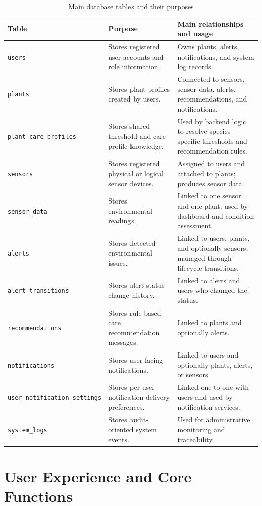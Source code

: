 \begin{table}[H]
\centering
\caption{Main database tables and their purposes}
\label{tab:main-database-tables}
\begin{tabular}{p{}p{}p{}}
\hline
\textbf{Table} & \textbf{Purpose} & \textbf{Main relationships and usage} \\
\hline
\texttt{users} & Stores registered user accounts and role information. & Owns plants, alerts, notifications, and system log records. \\
\texttt{plants} & Stores plant profiles created by users. & Connected to sensors, sensor data, alerts, recommendations, and notifications. \\
\texttt{plant\_care\_profiles} & Stores shared threshold and care-profile knowledge. & Used by backend logic to resolve species-specific thresholds and recommendation rules. \\
\texttt{sensors} & Stores registered physical or logical sensor devices. & Assigned to users and attached to plants; produces sensor data. \\
\texttt{sensor\_data} & Stores environmental readings. & Linked to one sensor and one plant; used by dashboard and condition assessment. \\
\texttt{alerts} & Stores detected environmental issues. & Linked to users, plants, and optionally sensors; managed through lifecycle transitions. \\
\texttt{alert\_transitions} & Stores alert status change history. & Linked to alerts and users who changed the status. \\
\texttt{recommendations} & Stores rule-based care recommendation messages. & Linked to plants and optionally alerts. \\
\texttt{notifications} & Stores user-facing notifications. & Linked to users and optionally plants, alerts, or sensors. \\
\texttt{user\_notification\_settings} & Stores per-user notification delivery preferences. & Linked one-to-one with users and used by notification services. \\
\texttt{system\_logs} & Stores audit-oriented system events. & Used for administrative monitoring and traceability. \\
\hline
\end{tabular}
\end{table}

\section{User Experience and Core Functions}
\label{sec:user-experience-core-functions}

